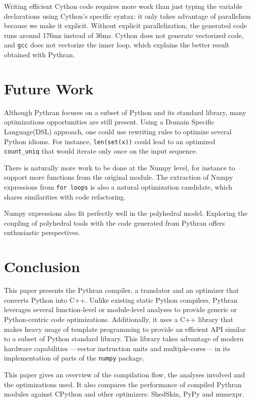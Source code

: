 \documentclass[10pt, onecolumn, preprint]{sigplanconf}
\begin{document}
Writing efficient Cython code requires more work than just typing the variable
declarations using Cython's specific syntax: it only takes advantage of
parallelism because we make it explicit. Without explicit parallelization,
the generated code runs around 176ms instead of 36ms. %
Cython does not generate
vectorized code, and \texttt{gcc} does not vectorize the inner loop, which 
explains the better result obtained with Pythran.

\section{Future Work}

Although Pythran focuses on a subset of Python and its standard library, many
optimizations opportunities are still present. Using a Domain Specific
Language(DSL) approach, one could use rewriting rules to optimize several
Python idioms. For instance, \texttt{len(set(x))} could lead to an optimized
\texttt{count\_uniq} that would iterate only once on the input sequence.

There is naturally more work to be done at the Numpy level, for instance to
support more functions from the original module. The extraction of Numpy
expressions from \texttt{for loops} is also a natural optimization candidate, which
shares similarities with code refactoring.

Numpy expressions also fit perfectly well in the polyhedral model. Exploring
the coupling of polyhedral tools with the code generated from Pythran offers
enthusiastic perspectives.

\section{Conclusion}

This paper presents the Pythran compiler, a translator and an optimizer that
converts Python into C++. Unlike existing static Python compilers, Pythran
leverages several function-level or module-level analyses to provide
generic or Python-centric code optimizations. Additionally, it uses a C++
library that makes heavy usage of template programming to provide an efficient
API similar to a subset of Python standard library. This library takes
advantage of modern hardware capabilities ---vector instruction units and
multiple-cores--- in its implementation of parts of the \texttt{numpy} package.

This paper gives an overview of the compilation flow, the analyses involved and
the optimizations used. It also compares the performance of compiled Pythran
modules against CPython and other optimizers: ShedSkin, PyPy and numexpr.
\end{document}

